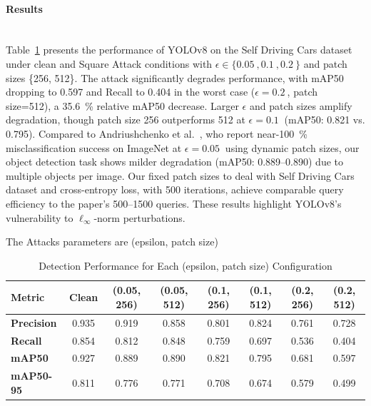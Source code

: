 \documentclass[../main.tex]{subfiles}
\begin{document}
\paragraph{Results}\leavevmode\\
Table~\ref{tab:yolo_square_overall_performance} presents the performance of YOLOv8 on the Self Driving Cars dataset under clean and Square Attack conditions with $\epsilon \in \{\SI{0.05}{}, \SI{0.1}{}, \SI{0.2}{}\}$ and patch sizes \{256, 512\}. The attack significantly degrades performance, with mAP50 dropping to \SI{0.597}{} and Recall to \SI{0.404}{} in the worst case ($\epsilon=\SI{0.2}{}$, patch size=512), a \SI{35.6}{\%} relative mAP50 decrease. Larger $\epsilon$ and patch sizes amplify degradation, though patch size 256 outperforms 512 at $\epsilon=\SI{0.1}{}$ (mAP50: \SI{0.821}{} vs. \SI{0.795}{}). Compared to Andriushchenko et al.~\cite{andriushchenko2020square}, who report near-\SI{100}{\%} misclassification success on ImageNet at $\epsilon=\SI{0.05}{}$ using dynamic patch sizes, our object detection task shows milder degradation (mAP50: \SI{0.889}{}--\SI{0.890}{}) due to multiple objects per image. Our fixed patch sizes to deal with Self Driving Cars dataset and cross-entropy loss, with \SI{500}{} iterations, achieve comparable query efficiency to the paper’s \SI{500}{}--\SI{1500}{} queries. These results highlight YOLOv8’s vulnerability to $\ell_\infty$-norm perturbations.

The Attacks parameters are (epsilon, patch size)

\begin{table}[H]
\centering
\caption{Detection Performance for Each (epsilon, patch size) Configuration}
\label{tab:yolo_square_overall_performance}
\begin{tabular}{l c c c c c c c}
\toprule
\textbf{Metric} 
    & Clean & (0.05, 256) & (0.05, 512) & (0.1, 256) & (0.1, 512) & (0.2, 256) & (0.2, 512) \\
\midrule
\textbf{Precision} & 0.935 & 0.919 & 0.858 & 0.801 & 0.824 & 0.761 & 0.728 \\
\textbf{Recall}    & 0.854 & 0.812 & 0.848 & 0.759 & 0.697 & 0.536 & 0.404 \\
\textbf{mAP50}     & 0.927 & 0.889 & 0.890 & 0.821 & 0.795 & 0.681 & 0.597 \\
\textbf{mAP50-95}  & 0.811 & 0.776 & 0.771 & 0.708 & 0.674 & 0.579 & 0.499 \\
\bottomrule
\end{tabular}
\end{table}
\end{document}
